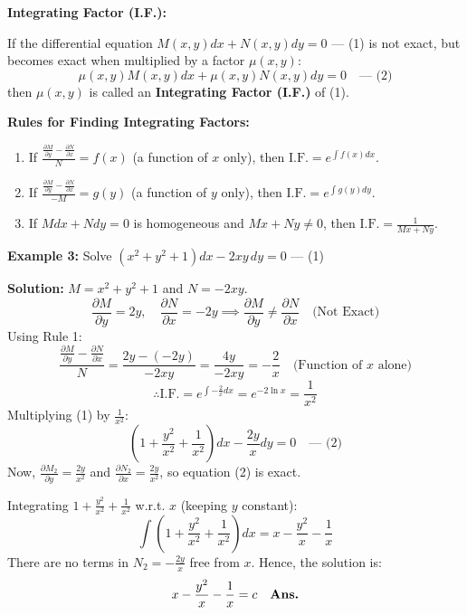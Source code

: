 \documentclass[11pt,a4paper]{article}
\newcommand{\Heading}[1]{\vspace{0.3cm}\noindent\textbf{\textcolor{AcademicGreen}{\large #1}}\par\vspace{0.15cm}}
\begin{document}
\newpage

\vspace{0.4cm}
\Heading{Integrating Factor (I.F.):}
If the differential equation $M(x,y)dx + N(x,y)dy = 0$ \quad --- (1) is not exact, but becomes exact when multiplied by a factor $\mu(x,y)$:
\begin{equation}
    \mu(x,y)M(x,y)dx + \mu(x,y)N(x,y)dy = 0 \quad \text{--- (2)}
\end{equation}
then $\mu(x,y)$ is called an \textbf{Integrating Factor (I.F.)} of (1).

\vspace{0.3cm}
\Heading{Rules for Finding Integrating Factors:}

\begin{enumerate}[leftmargin=*, label=\textbf{Rule \arabic*:}]
    \item If $\frac{\frac{\partial M}{\partial y} - \frac{\partial N}{\partial x}}{N} = f(x)$ (a function of $x$ only), then $\text{I.F.} = e^{\int f(x)dx}$.
    \item If $\frac{\frac{\partial M}{\partial y} - \frac{\partial N}{\partial x}}{-M} = g(y)$ (a function of $y$ only), then $\text{I.F.} = e^{\int g(y)dy}$.
    \item If $M dx + N dy = 0$ is homogeneous and $Mx + Ny \neq 0$, then $\text{I.F.} = \frac{1}{Mx + Ny}$.
\end{enumerate}

\begin{tcolorbox}[greenbox]
    \textbf{\textcolor{AcademicGreen}{Example 3:}} Solve $(x^2 + y^2 + 1)dx - 2xy \, dy = 0$ \quad --- (1)
    
    \vspace{0.15cm}
    \noindent\textbf{Solution:} $M = x^2 + y^2 + 1$ and $N = -2xy$.
    \[
    \frac{\partial M}{\partial y} = 2y, \quad \frac{\partial N}{\partial x} = -2y \implies \frac{\partial M}{\partial y} \neq \frac{\partial N}{\partial x} \quad \text{(Not Exact)}
    \]
    Using Rule 1:
    \[
    \frac{\frac{\partial M}{\partial y} - \frac{\partial N}{\partial x}}{N} = \frac{2y - (-2y)}{-2xy} = \frac{4y}{-2xy} = -\frac{2}{x} \quad \text{(Function of } x \text{ alone)}
    \]
    \[
    \therefore \text{I.F.} = e^{\int -\frac{2}{x} dx} = e^{-2\ln x} = \frac{1}{x^2}
    \]
    Multiplying (1) by $\frac{1}{x^2}$:
    \[
    \left(1 + \frac{y^2}{x^2} + \frac{1}{x^2}\right)dx - \frac{2y}{x}dy = 0 \quad \text{--- (2)}
    \]
    Now, $\frac{\partial M_2}{\partial y} = \frac{2y}{x^2}$ and $\frac{\partial N_2}{\partial x} = \frac{2y}{x^2}$, so equation (2) is exact.
    
    \noindent Integrating $1 + \frac{y^2}{x^2} + \frac{1}{x^2}$ w.r.t. $x$ (keeping $y$ constant):
    \[
    \int \left(1 + \frac{y^2}{x^2} + \frac{1}{x^2}\right)dx = x - \frac{y^2}{x} - \frac{1}{x}
    \]
    There are no terms in $N_2 = -\frac{2y}{x}$ free from $x$. Hence, the solution is:
    \[
    x - \frac{y^2}{x} - \frac{1}{x} = c \quad \text{\textbf{Ans.}}
    \]
\end{tcolorbox}
\end{document}
